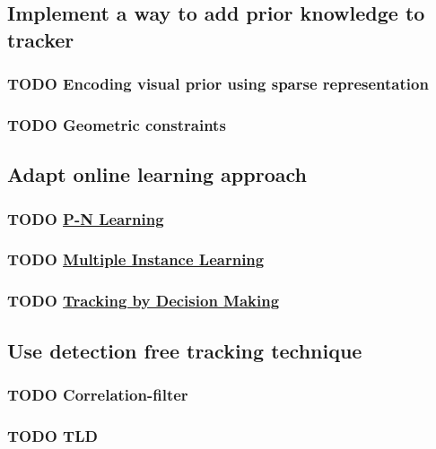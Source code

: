 \documentclass[11pt]{article}
\begin{document}
\subsection{Implement a way to add prior knowledge to tracker}
\label{sec:org1e4bde5}
\subsubsection{{\bfseries\sffamily TODO} Encoding visual prior using sparse representation}
\label{sec:orgb9d248e}
\subsubsection{{\bfseries\sffamily TODO} Geometric constraints}
\label{sec:org7f156d8}
\subsection{Adapt online learning approach}
\label{sec:orgcfbe7b9}
\subsubsection{{\bfseries\sffamily TODO} \href{http://cmp.felk.cvut.cz/\~matas/papers/kalal-pn\_learning-cvpr10.pdf}{P-N Learning}}
\label{sec:org4abd578}
\subsubsection{{\bfseries\sffamily TODO} \href{http://vision.ucsd.edu/\~bbabenko/data/miltrack\_cvpr09.pdf}{Multiple Instance Learning}}
\label{sec:orgf163555}
\subsubsection{{\bfseries\sffamily TODO} \href{http://cvgl.stanford.edu/papers/xiang\_iccv15.pdf}{Tracking by Decision Making}}
\label{sec:org4512a70}
\subsection{Use detection free tracking technique}
\label{sec:orgfac0155}
\subsubsection{{\bfseries\sffamily TODO} Correlation-filter}
\label{sec:org7c969b1}
\subsubsection{{\bfseries\sffamily TODO} TLD}
\label{sec:org18835da}
\end{document}
